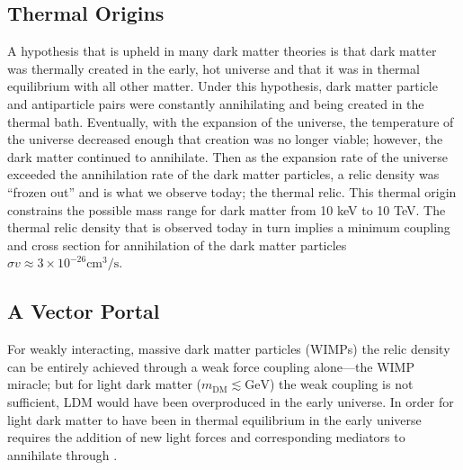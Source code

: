 \documentclass[a4paper,12pt]{article}
\begin{document}
    \subsection{Thermal Origins}

        A hypothesis that is upheld in many dark matter theories is that dark
        matter was thermally created in the early, hot universe and that it was
        in thermal equilibrium with all other matter.  Under this hypothesis,
        dark matter particle and antiparticle pairs were constantly annihilating
        and being created in the thermal bath. Eventually, with the expansion of
        the universe, the temperature of the universe decreased enough that
        creation was no longer viable; however, the dark matter continued to
        annihilate. Then as the expansion rate of the universe exceeded the
        annihilation rate of the dark matter particles, a relic density was
        ``frozen out'' and is what we observe today; the thermal relic. This
        thermal origin constrains the possible mass range for dark matter from
        10 keV to 10 TeV. The thermal relic density that is observed today in
        turn implies a minimum coupling and cross section for annihilation of
        the dark matter particles $\sigma v \approx 3 \times 10^{-26}
        \text{cm}^3/\text{s}$. 
        
    \subsection{A Vector Portal}
        For weakly interacting, massive dark matter particles (WIMPs) the
        relic density can be entirely achieved through a weak force coupling
        alone---the WIMP miracle; but for light dark matter ($m_{\text{DM}}
        \lesssim \text{GeV}$) the weak coupling is not sufficient, LDM would
        have been overproduced in the early universe.  In order for light dark
        matter to have been in thermal equilibrium in the early universe
        requires the addition of new light forces and corresponding mediators to
        annihilate through \cite{Holdom}.
\end{document}
